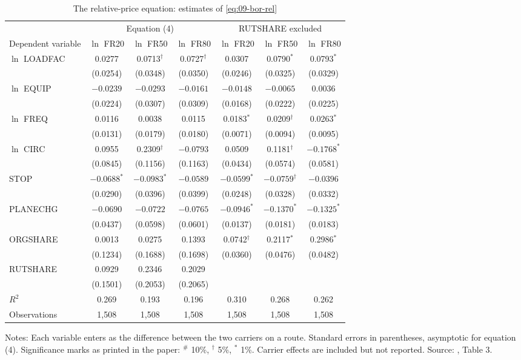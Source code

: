 \begin{table}[htbp]
\centering
\caption{The relative-price equation: estimates of \cref{eq:09-bor-rel}}
\label{tab:09-bor-rel}
\footnotesize
\begin{tabular}{@{}lcccccc@{}}
\toprule
& \multicolumn{3}{c}{Equation (4)} & \multicolumn{3}{c}{RUTSHARE excluded} \\
\cmidrule(lr){2-4} \cmidrule(l){5-7}
Dependent variable & $\ln$ FR20 & $\ln$ FR50 & $\ln$ FR80 & $\ln$ FR20 & $\ln$ FR50 & $\ln$ FR80 \\
\midrule
$\ln$ LOADFAC & 0.0277 & 0.0713$^{\dagger}$ & 0.0727$^{\dagger}$ & 0.0307 & 0.0790$^{*}$ & 0.0793$^{*}$ \\
 & (0.0254) & (0.0348) & (0.0350) & (0.0246) & (0.0325) & (0.0329) \\
$\ln$ EQUIP & $-0.0239$ & $-0.0293$ & $-0.0161$ & $-0.0148$ & $-0.0065$ & 0.0036 \\
 & (0.0224) & (0.0307) & (0.0309) & (0.0168) & (0.0222) & (0.0225) \\
$\ln$ FREQ & 0.0116 & 0.0038 & 0.0115 & 0.0183$^{*}$ & 0.0209$^{\dagger}$ & 0.0263$^{*}$ \\
 & (0.0131) & (0.0179) & (0.0180) & (0.0071) & (0.0094) & (0.0095) \\
$\ln$ CIRC & 0.0955 & 0.2309$^{\dagger}$ & $-0.0793$ & 0.0509 & 0.1181$^{\dagger}$ & $-0.1768^{*}$ \\
 & (0.0845) & (0.1156) & (0.1163) & (0.0434) & (0.0574) & (0.0581) \\
STOP & $-0.0688^{*}$ & $-0.0983^{*}$ & $-0.0589$ & $-0.0599^{*}$ & $-0.0759^{\dagger}$ & $-0.0396$ \\
 & (0.0290) & (0.0396) & (0.0399) & (0.0248) & (0.0328) & (0.0332) \\
PLANECHG & $-0.0690$ & $-0.0722$ & $-0.0765$ & $-0.0946^{*}$ & $-0.1370^{*}$ & $-0.1325^{*}$ \\
 & (0.0437) & (0.0598) & (0.0601) & (0.0137) & (0.0181) & (0.0183) \\
ORGSHARE & 0.0013 & 0.0275 & 0.1393 & 0.0742$^{\dagger}$ & 0.2117$^{*}$ & 0.2986$^{*}$ \\
 & (0.1234) & (0.1688) & (0.1698) & (0.0360) & (0.0476) & (0.0482) \\
RUTSHARE & 0.0929 & 0.2346 & 0.2029 & & & \\
 & (0.1501) & (0.2053) & (0.2065) & & & \\
\addlinespace
$R^2$ & 0.269 & 0.193 & 0.196 & 0.310 & 0.268 & 0.262 \\
Observations & 1,508 & 1,508 & 1,508 & 1,508 & 1,508 & 1,508 \\
\bottomrule
\end{tabular}

\smallskip
\begin{minipage}{0.95\linewidth}
\footnotesize Notes: Each variable enters as the difference between the two carriers on a route. Standard
errors in parentheses, asymptotic for equation (4). Significance marks as printed in the paper: $^{\#}$ 10\%,
$^{\dagger}$ 5\%, $^{*}$ 1\%. Carrier effects are included but not reported. Source: \citet{Borenstein1989},
Table 3.
\end{minipage}
\end{table}

